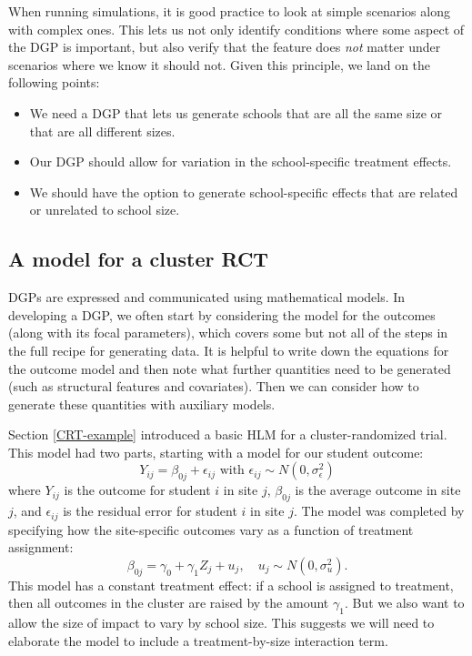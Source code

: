 \documentclass[
]{book}
\providecommand{\tightlist}{%
  \setlength{\itemsep}{0pt}\setlength{\parskip}{0pt}}
\begin{document}
When running simulations, it is good practice to look at simple scenarios along with complex ones.
This lets us not only identify conditions where some aspect of the DGP is important, but also verify that the feature does \emph{not} matter under scenarios where we know it should not.
Given this principle, we land on the following points:

\begin{itemize}
\tightlist
\item
  We need a DGP that lets us generate schools that are all the same size or that are all different sizes.
\item
  Our DGP should allow for variation in the school-specific treatment effects.
\item
  We should have the option to generate school-specific effects that are related or unrelated to school size.
\end{itemize}

\subsection{A model for a cluster RCT}\label{a-model-for-a-cluster-rct}

DGPs are expressed and communicated using mathematical models.
In developing a DGP, we often start by considering the model for the outcomes (along with its focal parameters), which covers some but not all of the steps in the full recipe for generating data.
It is helpful to write down the equations for the outcome model and then note what further quantities need to be generated (such as structural features and covariates).
Then we can consider how to generate these quantities with auxiliary models.

Section \ref{CRT-example} introduced a basic HLM for a cluster-randomized trial.
This model had two parts, starting with a model for our student outcome:
\[ Y_{ij} = \beta_{0j} + \epsilon_{ij} \mbox{ with } \epsilon_{ij} \sim N( 0, \sigma^2_\epsilon ) \]
where \(Y_{ij}\) is the outcome for student \(i\) in site \(j\), \(\beta_{0j}\) is the average outcome in site \(j\), and \(\epsilon_{ij}\) is the residual error for student \(i\) in site \(j\).
The model was completed by specifying how the site-specific outcomes vary as a function of treatment assignment:
\[ \beta_{0j} = \gamma_{0} + \gamma_{1} Z_j + u_j, \quad u_j \sim N( 0, \sigma^2_u ).\]
This model has a constant treatment effect: if a school is assigned to treatment, then all outcomes in the cluster are raised by the amount \(\gamma_{1}\).
But we also want to allow the size of impact to vary by school size.
This suggests we will need to elaborate the model to include a treatment-by-size interaction term.
\end{document}
